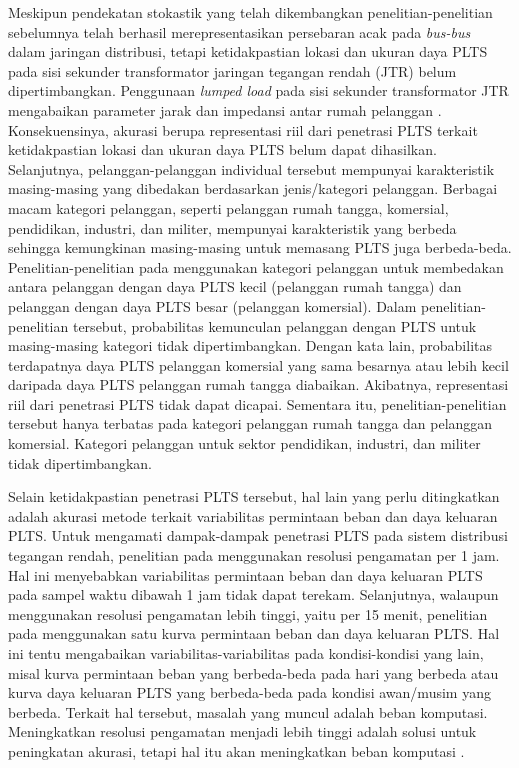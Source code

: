 Meskipun pendekatan stokastik yang telah dikembangkan penelitian-penelitian sebelumnya telah berhasil merepresentasikan persebaran acak pada \textit{bus-bus} dalam jaringan distribusi, tetapi ketidakpastian lokasi dan ukuran daya PLTS pada sisi sekunder transformator jaringan tegangan rendah (JTR) belum dipertimbangkan. Penggunaan \textit{lumped load} pada sisi sekunder transformator JTR mengabaikan parameter jarak dan impedansi antar rumah pelanggan \cite{ding_distributed_2017,atmaja_rooftop_2019,atmaja_hosting_2019,atmaja_evaluation_2020}. Konsekuensinya, akurasi berupa representasi riil dari penetrasi PLTS terkait ketidakpastian lokasi dan ukuran daya PLTS belum dapat dihasilkan. Selanjutnya, pelanggan-pelanggan individual tersebut mempunyai karakteristik masing-masing yang dibedakan berdasarkan jenis/kategori pelanggan. Berbagai macam kategori pelanggan, seperti pelanggan rumah tangga, komersial, pendidikan, industri, dan militer, mempunyai karakteristik yang berbeda sehingga kemungkinan masing-masing untuk memasang PLTS juga berbeda-beda. Penelitian-penelitian pada \cite{electric_power_research_institute_stochastic_2012,dubey_understanding_2015} menggunakan kategori pelanggan untuk membedakan antara pelanggan dengan daya PLTS kecil (pelanggan rumah tangga) dan pelanggan dengan daya PLTS besar (pelanggan komersial). Dalam penelitian-penelitian tersebut, probabilitas kemunculan pelanggan dengan PLTS untuk masing-masing kategori tidak dipertimbangkan. Dengan kata lain, probabilitas terdapatnya daya PLTS pelanggan komersial yang sama besarnya atau lebih kecil daripada daya PLTS pelanggan rumah tangga diabaikan. Akibatnya, representasi riil dari penetrasi PLTS tidak dapat dicapai. Sementara itu, penelitian-penelitian tersebut hanya terbatas pada kategori pelanggan rumah tangga dan pelanggan komersial. Kategori pelanggan untuk sektor pendidikan, industri, dan militer tidak dipertimbangkan. 

Selain ketidakpastian penetrasi PLTS tersebut, hal lain yang perlu ditingkatkan adalah akurasi metode terkait variabilitas permintaan beban dan daya keluaran PLTS. Untuk mengamati dampak-dampak penetrasi PLTS pada sistem distribusi tegangan rendah, penelitian pada \cite{ding_distributed_2017} menggunakan resolusi pengamatan per 1 jam. Hal ini menyebabkan variabilitas permintaan beban dan daya keluaran PLTS pada sampel waktu dibawah 1 jam tidak dapat terekam. Selanjutnya, walaupun menggunakan resolusi pengamatan lebih tinggi, yaitu per 15 menit, penelitian pada \cite{torquato_comprehensive_2018} menggunakan satu kurva permintaan beban dan daya keluaran PLTS. Hal ini tentu mengabaikan variabilitas-variabilitas pada kondisi-kondisi yang lain, misal kurva permintaan beban yang berbeda-beda pada hari yang berbeda atau kurva daya keluaran PLTS yang berbeda-beda pada kondisi awan/musim yang berbeda. Terkait hal tersebut, masalah yang muncul adalah beban komputasi. Meningkatkan resolusi pengamatan menjadi lebih tinggi adalah solusi untuk peningkatan akurasi, tetapi hal itu akan meningkatkan beban komputasi \cite{beck_assessing_2016}.

